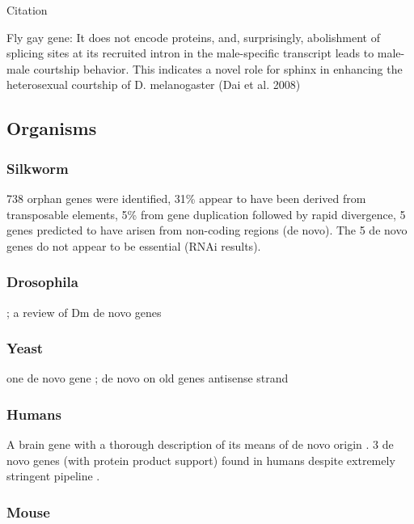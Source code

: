     Citation \cite{hotopp_widespread_2007}

Fly gay gene: It does not encode proteins, and, surprisingly, abolishment
of splicing sites at its recruited intron in the male-specific transcript
leads to male-male courtship behavior. This indicates a novel role for
sphinx in enhancing the heterosexual courtship of D. melanogaster (Dai et
al. 2008)

\subsection{Organisms}

\subsubsection{Silkworm}

  \cite{sun_identification_2015}

  738 orphan genes were identified, 31\% appear to have been derived from
  transposable elements, 5\% from gene duplication followed by rapid
  divergence, 5 genes predicted to have arisen from non-coding regions (de
  novo). The 5 de novo genes do not appear to be essential (RNAi results).

\subsubsection{Drosophila}

    \cite{levine_novel_2006, begun_evidence_2006}; a review of Dm de novo
    genes \cite{zhou_origin_2008}

\subsubsection{Yeast}

    one de novo gene \cite{cai_novo_2008}; de novo on old genes antisense
    strand \cite{li_novo_2010}

\subsubsection{Humans} 

    A brain gene with a thorough description of its means of de novo origin
    \cite{li_human-specific_2010}. 3 de novo genes (with protein product
    support) found in humans despite extremely stringent pipeline
    \cite{knowles_recent_2009}.

\subsubsection{Mouse}

